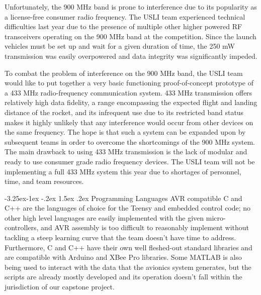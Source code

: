 \documentclass[onecolumn, draftclsnofoot, 10pt, compsoc]{IEEEtran}
\makeatletter
\renewcommand\paragraph{\@startsection{paragraph}{4}{\z@}%
                                     {-3.25ex\@plus -1ex \@minus -.2ex}%
                                     {1.5ex \@plus .2ex}%
                                     {\normalfont\normalsize\bfseries}}
\makeatother
\begin{document}
\noindent Unfortunately, the 900 MHz band is prone to interference due to its popularity as a license-free consumer radio frequency. The USLI team experienced technical difficulties last year due to the presence of multiple other higher powered RF transceivers operating on the 900 MHz band at the competition. Since the launch vehicles must be set up and wait for a given duration of time, the 250 mW transmission was easily overpowered and data integrity was significantly impeded.\newline

\noindent To combat the problem of interference on the 900 MHz band, the USLI team would like to put together a very basic functioning proof-of-concept prototype of a 433 MHz radio-frequency communication system. 433 MHz transmission offers relatively high data fidelity, a range encompassing the expected flight and landing distance of the rocket, and its infrequent use due to its restricted band status makes it highly unlikely that any interference would occur from other devices on the same frequency. The hope is that such a system can be expanded upon by subsequent teams in order to overcome the shortcomings of the 900 MHz system. The main drawback to using 433 MHz transmission is the lack of modular and ready to use consumer grade radio frequency devices. The USLI team will not be implementing a full 433 MHz system this year due to shortages of personnel, time, and team resources.


\paragraph{Programming Languages}
AVR compatible C and C++ are the languages of choice for the Teensy and embedded control code; no other high level languages are easily implemented with the given micro-controllers, and AVR assembly is too difficult to reasonably implement without tackling a steep learning curve that the team doesn't have time to address. Furthermore, C and C++ have their own well fleshed-out standard libraries and are compatible with Arduino and XBee Pro libraries. Some MATLAB is also being used to interact with the data that the avionics system generates, but the scripts are already mostly developed and its operation doesn't fall within the jurisdiction of our capstone project.

\newpage
\end{document}
